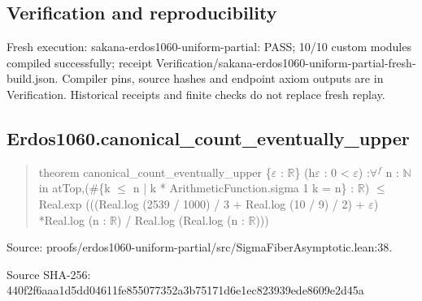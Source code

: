 \documentclass[11pt,a4paper]{article}
\begin{document}
\subsection{Verification and reproducibility}
Fresh execution: sakana-erdos1060-uniform-partial: PASS; 10/10 custom modules compiled successfully; receipt Verification/sakana-erdos1060-uniform-partial-fresh-build.json. Compiler pins, source hashes and endpoint axiom outputs are in Verification. Historical receipts and finite checks do not replace fresh replay.

\begin{samepage}
\subsection{Erdos1060.canonical\_count\_eventually\_upper}
\begin{quote}\small\ttfamily theorem canonical\_count\_eventually\_upper \{\ensuremath{\varepsilon} : \ensuremath{\mathbb{R}}\} (h\ensuremath{\varepsilon} : 0 < \ensuremath{\varepsilon}) :\newline     \ensuremath{\forall}\ensuremath{^{f}} n : \ensuremath{\mathbb{N}} in atTop,\newline       (\#\{k \ensuremath{\leq} n | k * ArithmeticFunction.sigma 1 k = n\} : \ensuremath{\mathbb{R}}) \ensuremath{\leq}\newline         Real.exp (((Real.log (2539 / 1000) / 3 + Real.log (10 / 9) / 2) + \ensuremath{\varepsilon}) *\newline           Real.log (n : \ensuremath{\mathbb{R}}) / Real.log (Real.log (n : \ensuremath{\mathbb{R}})))\end{quote}
{\small Source: proofs/erdos1060-uniform-partial/src/SigmaFiberAsymptotic.lean:38.\par}

{\small Source SHA-256: 440f2f6aaa1d5dd04611fe855077352a3b75171d6e1ec823939ede8609e2d45a\par}

\end{samepage}
\end{document}
